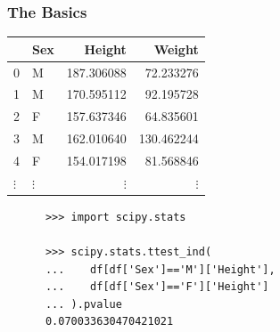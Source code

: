 \documentclass{beamer}
\begin{document}

\begin{frame}[fragile]
  \frametitle{The Basics}
  \begin{center}
    \begin{tabular}{llrr}
    \toprule
    & Sex & Height & Weight \\
    \midrule
    0 & M & 187.306088 & 72.233276 \\
    1 & M & 170.595112 & 92.195728 \\
    2 & F & 157.637346 & 64.835601 \\
    3 & M & 162.010640 & 130.462244 \\
    4 & F & 154.017198 & 81.568846 \\
    $\vdots$ & $\vdots$ & $\vdots$ & $\vdots$ \\
    \bottomrule
  \end{tabular}
  \pause
  \small{
    \begin{verbatim}
      >>> import scipy.stats

      >>> scipy.stats.ttest_ind(
      ...    df[df['Sex']=='M']['Height'],
      ...    df[df['Sex']=='F']['Height']
      ... ).pvalue
      0.070033630470421021
    \end{verbatim}
  }
  \end{center}
\end{frame}
\end{document}
